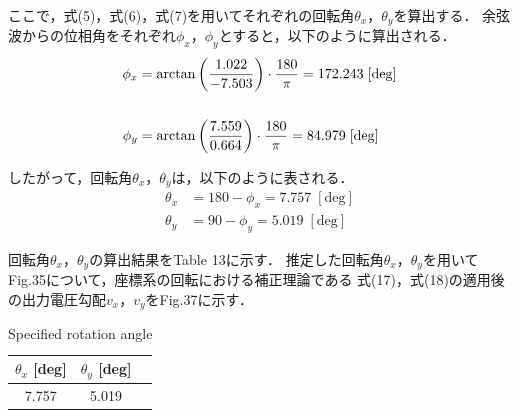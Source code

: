 ここで，式(5)，式(6)，式(7)を用いてそれぞれの回転角$\theta_x$，$\theta_y$を算出する．
余弦波からの位相角をそれぞれ$\phi_x$，$\phi_y$とすると，以下のように算出される．
\begin{align}
  \phi_x & = \arctan \left(\frac{1.022}{-7.503}\right) \cdot \frac{180}{\pi} = 172.243\; [\mathrm{deg}] \\
  \notag                                                                                                \\
  \phi_y & = \arctan \left(\frac{7.559}{0.664}\right) \cdot \frac{180}{\pi} = 84.979\; [\mathrm{deg}]
\end{align}

したがって，回転角$\theta_x$，$\theta_y$は，以下のように表される．
\begin{align}
  \theta_x & = 180 - \phi_x = 7.757 \; [\mathrm{deg}] \\
  \theta_y & = 90 - \phi_y = 5.019 \; [\mathrm{deg}]
\end{align}

回転角$\theta_x$，$\theta_y$の算出結果をTable 13に示す．
推定した回転角$\theta_x$，$\theta_y$を用いて
Fig.35について，座標系の回転における補正理論である
式(17)，式(18)の適用後の出力電圧勾配$v_x$，$v_y$をFig.37に示す．

\begin{table}[htbp]
  \begin{center}
    \caption{Specified rotation angle}
    \begin{tabular}{|p{30mm}|p{20mm}|p{20mm}|}
      \hline
      \multicolumn{1}{|c|}{$\theta_x$ [deg]} & \multicolumn{1}{|c|}{$\theta_y$ [deg]} \\ \hline
      \multicolumn{1}{|c|}{7.757}            & \multicolumn{1}{|c|}{5.019}            \\ \hline
    \end{tabular}
  \end{center}
\end{table}

